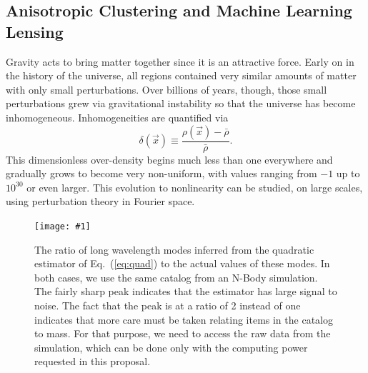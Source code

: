 \documentclass[12pt]{article}
\newcommand{\sfig}[2]{
\begin{center}
\texttt{[image: \#1]}
\end{center}
        }
\newcommand{\Spng}[2]{
    \begin{figure}[htb]
    \sfig{#1.png}{.9\columnwidth}
    \caption{{\small #2}}
    \label{fig:#1}
    \end{figure}
}
\newcommand\be{\begin{equation}}
\def\ee{\end{equation}}
\newcommand{\ec}[1]{Eq.~(\ref{eq:#1})}
\begin{document}
\begin{small}

\subsection{Anisotropic Clustering and Machine Learning Lensing}

Gravity acts to bring matter together since it is an attractive force. Early on in the history of the universe, all regions contained very similar amounts of matter with only small perturbations. Over billions of years, though, those small perturbations grew via gravitational instability so that the universe has become inhomogeneous. Inhomogeneities are quantified via
\be
\delta(\vec x) \equiv \frac{\rho(\vec x) - \bar\rho}{\bar\rho}.\ee
This dimensionless over-density begins much less than one everywhere and gradually grows to become very non-uniform, with values ranging from $-1$ up to $10^{30}$ or even larger. This evolution to nonlinearity can be studied, on large scales, using perturbation theory in Fourier space.

\Spng{nbody}{The ratio of long wavelength modes inferred from the quadratic estimator of \ec{quad} to the actual values of these modes. In both cases, we use the same catalog from an N-Body simulation. The fairly sharp peak indicates that the estimator has large signal to noise. The fact that the peak is at a ratio of 2 instead of one indicates that more care must be taken relating items in the catalog to mass. For that purpose, we need to access the raw data from the simulation, which can be done only with the computing power requested in this proposal.}



\end{small}
\end{document}
